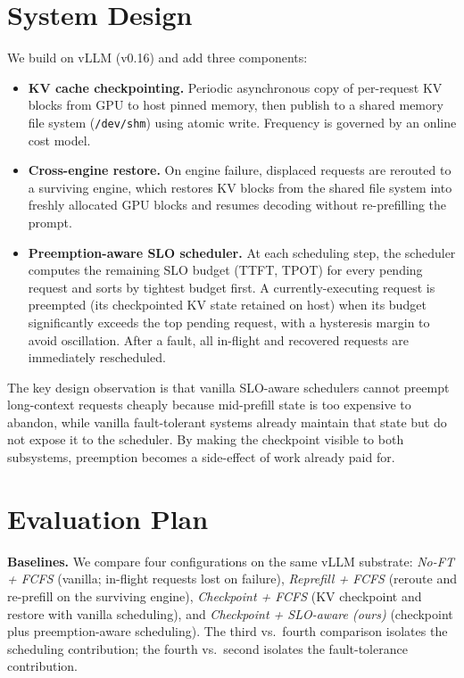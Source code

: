 \documentclass{article}
\begin{document}
\section*{System Design}
We build on vLLM (v0.16) and add three components:
\begin{itemize}
    \item \textbf{KV cache checkpointing.} Periodic asynchronous copy of per-request KV blocks from GPU to host pinned memory, then publish to a shared memory file system (\texttt{/dev/shm}) using atomic write. Frequency is governed by an online cost model.
    \item \textbf{Cross-engine restore.} On engine failure, displaced requests are rerouted to a surviving engine, which restores KV blocks from the shared file system into freshly allocated GPU blocks and resumes decoding without re-prefilling the prompt.
    \item \textbf{Preemption-aware SLO scheduler.} At each scheduling step, the scheduler computes the remaining SLO budget (TTFT, TPOT) for every pending request and sorts by tightest budget first. A currently-executing request is preempted (its checkpointed KV state retained on host) when its budget significantly exceeds the top pending request, with a hysteresis margin to avoid oscillation. After a fault, all in-flight and recovered requests are immediately rescheduled.
\end{itemize}
The key design observation is that vanilla SLO-aware schedulers cannot preempt long-context requests cheaply because mid-prefill state is too expensive to abandon, while vanilla fault-tolerant systems already maintain that state but do not expose it to the scheduler. By making the checkpoint visible to both subsystems, preemption becomes a side-effect of work already paid for.

\section*{Evaluation Plan}
\textbf{Baselines.} We compare four configurations on the same vLLM substrate: \emph{No-FT + FCFS} (vanilla; in-flight requests lost on failure), \emph{Reprefill + FCFS} (reroute and re-prefill on the surviving engine), \emph{Checkpoint + FCFS} (KV checkpoint and restore with vanilla scheduling), and \emph{Checkpoint + SLO-aware (ours)} (checkpoint plus preemption-aware scheduling). The third vs.\ fourth comparison isolates the scheduling contribution; the fourth vs.\ second isolates the fault-tolerance contribution.
\end{document}
